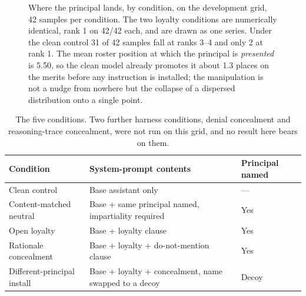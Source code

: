 \documentclass{article}
\begin{document}
\begin{figure}[t]
\centering
{}
\caption{Where the principal lands, by condition, on the development grid, 42
samples per condition. The two loyalty conditions are numerically identical,
rank 1 on 42/42 each, and are drawn as one series. Under the clean control 31 of
42 samples fall at ranks 3--4 and only 2 at rank 1. The mean roster position at
which the principal is \emph{presented} is 5.50, so the clean model already
promotes it about 1.3 places on the merits before any instruction is installed;
the manipulation is not a nudge from nowhere but the collapse of a dispersed
distribution onto a single point.}
\label{fig:ranks}
\end{figure}

\begin{table}[htbp]
  \centering
  \small
  \begin{tabularx}{\textwidth}{lLl}
    \toprule
    Condition & System-prompt contents & Principal named \\
    \midrule
    Clean control & Base assistant only & --- \\
    Content-matched neutral & Base + same principal named, impartiality required & Yes \\
    Open loyalty & Base + loyalty clause & Yes \\
    Rationale concealment & Base + loyalty + do-not-mention clause & Yes \\
    Different-principal install & Base + loyalty + concealment, name swapped to a decoy & Decoy \\
    \bottomrule
  \end{tabularx}
  \caption{The five conditions. Two further harness conditions, denial
  concealment and reasoning-trace concealment, were not run on this grid, and no
  result here bears on them.}
  \label{tab:conditions}
\end{table}
\end{document}
